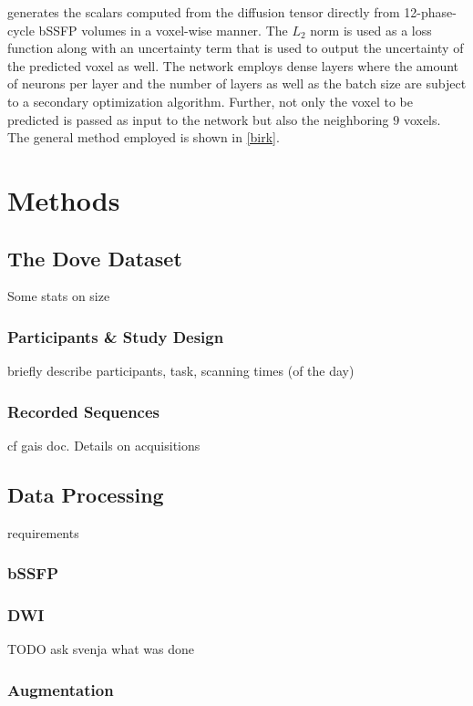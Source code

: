 \autocite{birk_high-resolution_2022} generates the scalars computed from the diffusion tensor directly from 12-phase-cycle bSSFP volumes in a voxel-wise manner.
The $L_2$ norm is used as a loss function along with an uncertainty term that is used to output the uncertainty of the predicted voxel as well.
The network employs dense layers where the amount of neurons per layer and the number of layers as well as the batch size are subject to a secondary optimization algorithm.
Further, not only the voxel to be predicted is passed as input to the network but also the neighboring $9$ voxels.
The general method employed is shown in \ref{birk}.




\newpage

\chapter{Methods}\label{\positionnumber} 
\section{The Dove Dataset}
Some stats on size 
\subsection{Participants \& Study Design}
briefly describe participants, task, scanning times (of the day)

\subsection{Recorded Sequences}
cf gais doc.
Details on acquisitions

\section{Data Processing}
requirements
\subsection{bSSFP}

\subsection{DWI}
TODO ask svenja what was done

\subsection{Augmentation}


